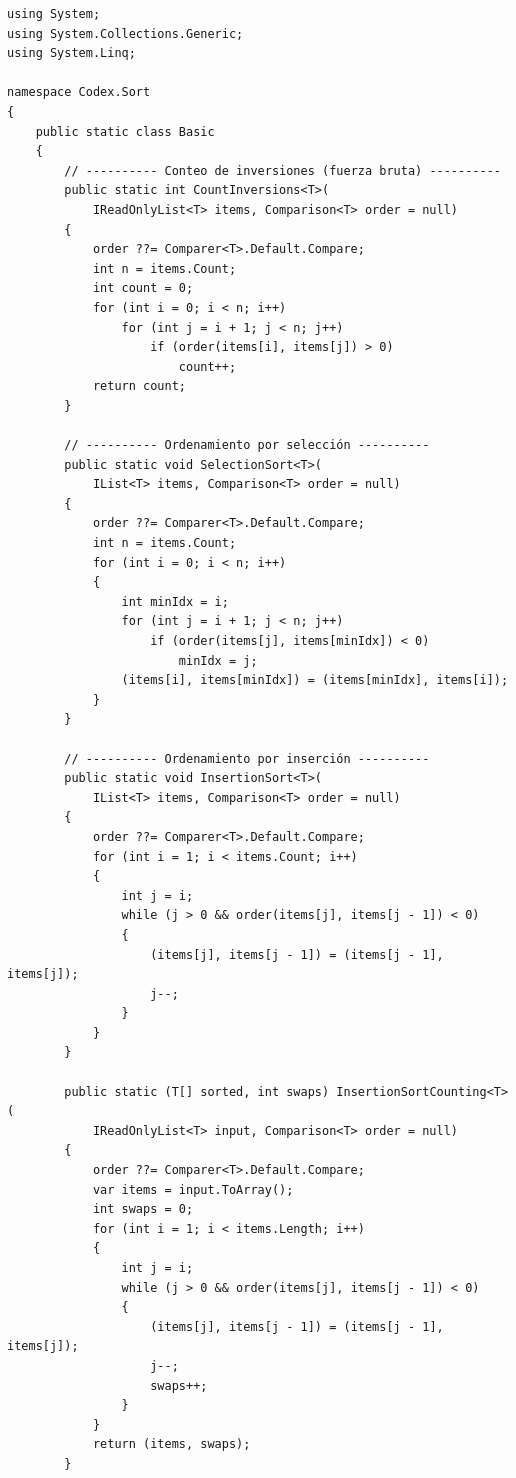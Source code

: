\documentclass[11pt,a4paper]{article}
\begin{document}
\begin{lstlisting}[caption={\texttt{Basic.cs} --- todos los algoritmos}]
using System;
using System.Collections.Generic;
using System.Linq;

namespace Codex.Sort
{
    public static class Basic
    {
        // ---------- Conteo de inversiones (fuerza bruta) ----------
        public static int CountInversions<T>(
            IReadOnlyList<T> items, Comparison<T> order = null)
        {
            order ??= Comparer<T>.Default.Compare;
            int n = items.Count;
            int count = 0;
            for (int i = 0; i < n; i++)
                for (int j = i + 1; j < n; j++)
                    if (order(items[i], items[j]) > 0)
                        count++;
            return count;
        }

        // ---------- Ordenamiento por selección ----------
        public static void SelectionSort<T>(
            IList<T> items, Comparison<T> order = null)
        {
            order ??= Comparer<T>.Default.Compare;
            int n = items.Count;
            for (int i = 0; i < n; i++)
            {
                int minIdx = i;
                for (int j = i + 1; j < n; j++)
                    if (order(items[j], items[minIdx]) < 0)
                        minIdx = j;
                (items[i], items[minIdx]) = (items[minIdx], items[i]);
            }
        }

        // ---------- Ordenamiento por inserción ----------
        public static void InsertionSort<T>(
            IList<T> items, Comparison<T> order = null)
        {
            order ??= Comparer<T>.Default.Compare;
            for (int i = 1; i < items.Count; i++)
            {
                int j = i;
                while (j > 0 && order(items[j], items[j - 1]) < 0)
                {
                    (items[j], items[j - 1]) = (items[j - 1], items[j]);
                    j--;
                }
            }
        }

        public static (T[] sorted, int swaps) InsertionSortCounting<T>(
            IReadOnlyList<T> input, Comparison<T> order = null)
        {
            order ??= Comparer<T>.Default.Compare;
            var items = input.ToArray();
            int swaps = 0;
            for (int i = 1; i < items.Length; i++)
            {
                int j = i;
                while (j > 0 && order(items[j], items[j - 1]) < 0)
                {
                    (items[j], items[j - 1]) = (items[j - 1], items[j]);
                    j--;
                    swaps++;
                }
            }
            return (items, swaps);
        }


\end{lstlisting}
\end{document}
